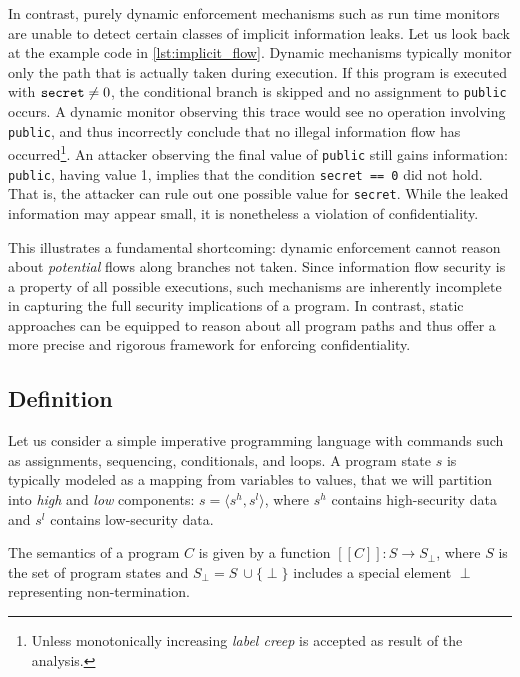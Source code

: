 \documentclass[12pt,a4paper,twoside]{book}
\newcommand{\llbracket}{[\![}
\newcommand{\rrbracket}{]\!]}
\begin{document}
In contrast, purely dynamic enforcement mechanisms such as run time monitors are unable to detect certain classes of implicit information leaks\cite{sabelfeld2003language}.
Let us look back at the example code in \ref{lst:implicit_flow}.
Dynamic mechanisms typically monitor only the path that is actually taken during execution. If this program is executed with $\verb|secret| \ne 0$, the conditional branch is skipped and no assignment to \verb|public| occurs. A dynamic monitor observing this trace would see no operation involving \verb|public|, and thus incorrectly conclude that no illegal information flow has occurred\footnote{Unless monotonically increasing \emph{label creep}\cite{sabelfeld2003language} is accepted as result of the analysis.}. An attacker observing the final value of \verb|public| still gains information: \verb|public|, having value 1, implies that the condition \verb|secret == 0| did not hold. That is, the attacker can rule out one possible value for \verb|secret|. While the leaked information may appear small, it is nonetheless a violation of confidentiality.

This illustrates a fundamental shortcoming: dynamic enforcement cannot reason about \textit{potential} flows along branches not taken. Since information flow security is a property of all possible executions\cite{sabelfeld2003language}\cite{denning1976lattice}, such mechanisms are inherently incomplete in capturing the full security implications of a program.
In contrast, static approaches can be equipped to reason about all program paths\cite{volpano1996sound} and thus offer a more precise and rigorous framework for enforcing confidentiality.

\subsection{Definition}
Let us consider a simple imperative programming language\cite{winskel1993formal} with commands such as assignments, sequencing, conditionals, and loops. A program state $s$ is typically modeled as a mapping from variables to values\cite{winskel1993formal}, that we will partition into \emph{high} and \emph{low} components: $s = \langle s^h, s^l \rangle$, where $s^h$ contains high-security data and $s^l$ contains low-security data.

The semantics of a program $C$ is given\cite{kahn1987natural}\cite{nielson1992semantics} by a function $\llbracket C \rrbracket : S \rightarrow S_\perp$, where $S$ is the set of program states and $S_\perp = S\ \cup \{ \perp \}$ includes a special element $\perp$ representing non-termination.
\end{document}
